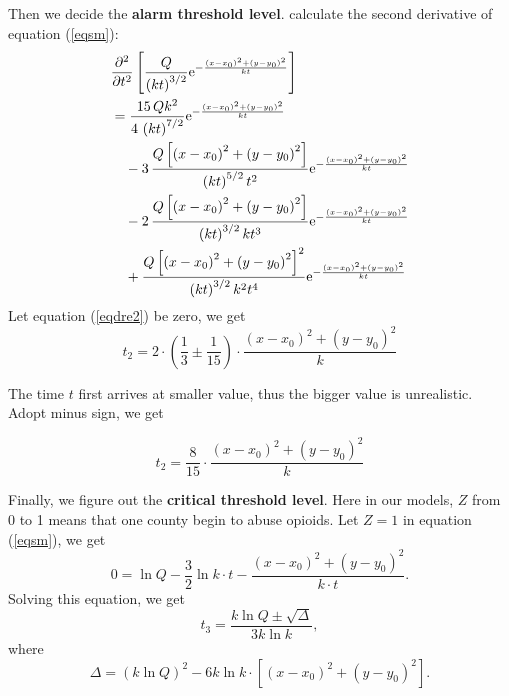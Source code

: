 \documentclass{mcmthesis}
\numberwithin{equation}{section}
\numberwithin{figure}{section}
\numberwithin{table}{section}
\theoremstyle{mydef}
\begin{document}
Then we decide the {\bf{alarm threshold level}}. calculate the second derivative of equation (\ref{eqsm}):
\begin{equation}
\begin{aligned}
&{\frac {\partial ^{2}}{\partial {t}^{2}}} \left[ {\frac {Q}{ \left( kt
 \right) ^{3/2}}{{\rm e}^{-{\frac { \left( x-x_0 \right) ^{2}+ \left( y-
y_0 \right) ^{2}}{kt}}}}} \right] \\
&={\frac {15\,Q{k}^{2}}{4\, \left( kt
 \right) ^{7/2}}{{\rm e}^{-{\frac { \left( x-x_0 \right) ^{2}+ \left( y-
y_0 \right) ^{2}}{kt}}}}}\\
&\quad-3\,{\frac {Q \left[  \left( x-x_0 \right) ^{2}+
 \left( y-y_0 \right) ^{2} \right] }{ \left( kt \right) ^{5/2}{t}^{2}}{
{\rm e}^{-{\frac { \left( x-x_0 \right) ^{2}+ \left( y-y_0 \right) ^{2}}{k
t}}}}}\\
&\quad-2\,{\frac {Q \left[  \left( x-x_0 \right) ^{2}+ \left( y-y_0
 \right) ^{2} \right] }{ \left( kt \right) ^{3/2}k{t}^{3}}{{\rm e}^{-{
\frac { \left( x-x_0 \right) ^{2}+ \left( y-y_0 \right) ^{2}}{kt}}}}}\\
&\quad+{
\frac {Q \left[  \left( x-x_0\right) ^{2}+ \left( y-y_0 \right) ^{2}
 \right] ^{2}}{ \left( kt \right) ^{3/2}{k}^{2}{t}^{4}}{{\rm e}^{-{
\frac { \left( x-x_0\right) ^{2}+ \left( y-y_0 \right) ^{2}}{kt}}}}}
\end{aligned}
\label{eqdre2}
\end{equation}
Let equation (\ref{eqdre2}) be zero, we get
\begin{equation}
t_2=2\cdot\left(\frac{1}{3}\pm\frac{1}{15}\right)\cdot\frac{(x-x_0)^2+
(y-y_0)^2}{k}
\end{equation}

The time $t$ first arrives at smaller value, thus the bigger value is unrealistic. Adopt minus sign, we get

\begin{equation}
t_2=\frac{8}{15}\cdot\frac{(x-x_0)^2+(y-y_0)^2}{k}
\end{equation}

Finally, we figure out the {\bf{critical threshold level}}. Here in our models, $Z$  from 0 to 1 means that one county begin to abuse opioids. Let $Z=1$ in equation (\ref{eqsm}), we get
\begin{equation}
0= \ln Q - \frac{3}{2}\ln k\cdot t-\frac{(x-x_{0})^2+(y-y_{0})^2}{k\cdot t}.
\end{equation}
Solving this equation, we get
\begin{equation}
t_3 = \frac{k\ln Q\pm\sqrt{\Delta}}{3k\ln k}, 
\end{equation}
where
\begin{equation}
\Delta=(k\ln Q)^2-6k\ln k\cdot
\left[(x-x_{0})^2+(y-y_{0})^2\right].
\end{equation}
\end{document}
